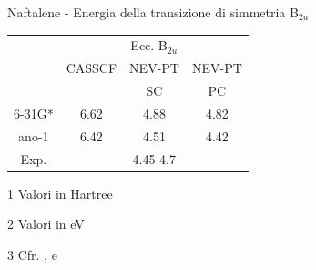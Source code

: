 \begin{center}
\begin{threeparttable}
\caption{\small Naftalene - Energia della transizione di simmetria B$_{2u}$}
\label{tab:naftalene_b2u}
{
\small
\begin{tabular}{|c|ccc|}
\hline
 				& \multicolumn{3}{c|}{ Ecc. B$_{2u}$ \tnote{2}} \\
				& CASSCF		& NEV-PT & NEV-PT \\
				& 				& SC	 & PC \\
\hline
6-31G*	&  6.62			& 4.88	 &  4.82 \\
ano-1	&  6.42			& 4.51	 & 4.42	\\
\hline
\hline
Exp.\tnote{3} &	 \multicolumn{3}{c|}{4.45-4.7} \\
\hline
\end{tabular}
}
\begin{tablenotes}
\small
 \item[1] Valori in Hartree
 \item[2] Valori in eV
 \item[3] Cfr. \cite{cpl-16-1972-464}, \cite{jms-26-1968-67} e \cite{jpb-25-1992-2197}
\end{tablenotes}
\end{threeparttable}
\end{center}
